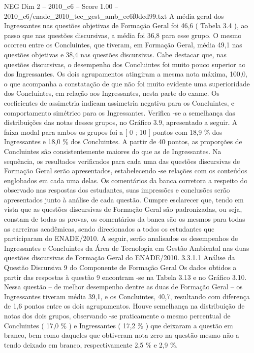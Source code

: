 \begin{textsample}{NEG Dim 2 – 2010\_c6 – Score 1.00 – 2010\_c6/enade\_2010\_tec\_gest\_amb\_ee6f0ded99.txt}
A média geral dos Ingressantes nas questões objetivas de Formação Geral foi 46,6 ( Tabela 3.4 ), ao passo que nas questões discursivas, a média foi 36,8 para esse grupo.
O mesmo ocorreu entre os Concluintes, que tiveram, em Formação Geral, média 49,1 nas questões objetivas e 38,4 nas questões discursivas.
Cabe destacar que, nas questões discursivas, o desempenho dos Concluintes foi muito pouco superior ao dos Ingressantes.
Os dois agrupamentos atingiram a mesma nota máxima, 100,0, o que acompanha a constatação de que não foi muito evidente uma superioridade dos Concluintes, em relação aos Ingressantes, nesta parte do exame.
Os coeficientes de assimetria indicam assimetria negativa para os Concluintes, e comportamento simétrico para os Ingressantes.
Verifica -se a semelhança das distribuições das notas desses grupos, no Gráfico 3.9, apresentado a seguir.
A faixa modal para ambos os grupos foi a [ 0 ; 10 ] pontos com 18,9 \% dos Ingressantes e 18,0 \% dos Concluintes.
A partir de 40 pontos, as proporções de Concluintes são consistentemente maiores do que as de Ingressantes.
Na sequência, os resultados verificados para cada uma das questões discursivas de Formação Geral serão apresentados, estabelecendo -se relações com os conteúdos englobados em cada uma delas.
Os comentários da banca corretora a respeito do observado nas respostas dos estudantes, suas impressões e conclusões serão apresentados junto à análise de cada questão.
Cumpre esclarecer que, tendo em vista que as questões discursivas de Formação Geral são padronizadas, ou seja, constam de todas as provas, os comentários da banca são os mesmos para todas as carreiras acadêmicas, sendo direcionados a todos os estudantes que participaram do ENADE/2010.
A seguir, serão analisados os desempenhos de Ingressantes e Concluintes da Área de Tecnologia em Gestão Ambiental nas duas questões discursivas de Formação Geral do ENADE/2010. 3.3.1.1 Análise da Questão Discursiva 9 do Componente de Formação Geral Os dados obtidos a partir das respostas à questão 9 encontram -se na Tabela 3.13 e no Gráfico 3.10.
Nessa questão – de melhor desempenho dentre as duas de Formação Geral – os Ingressantes tiveram média 39,1, e os Concluintes, 40,7, resultando com diferença de 1,6 pontos entre os dois agrupamentos.
Houve semelhança na distribuição de notas dos dois grupos, observando -se praticamente o mesmo percentual de Concluintes ( 17,0 \% ) e Ingressantes ( 17,2 \% ) que deixaram a questão em branco, bem como daqueles que obtiveram nota zero na questão mesmo não a tendo deixado em branco, respectivamente 2,5 \% e 2,9 \%.

\end{textsample}
